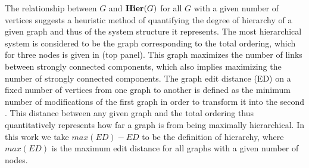 The relationship between $G$ and $\mathbf{Hier}(G)$ for all $G$ with a given number of vertices suggests a heuristic method of quantifying the degree of hierarchy of a given graph and thus of the system structure it represents. The most hierarchical system is considered to be the graph corresponding to the total ordering, which for three nodes is given in  (top panel). This graph maximizes the number of links between strongly connected components, which also implies maximizing the number of strongly connected components. The graph edit distance (ED) on a fixed number of vertices from one graph to another is defined as the minimum number of modifications of the first graph in order to transform it into the second \cite{Axenovich2011}. This distance between any given graph and the total ordering thus quantitatively represents how far a graph is from being maximally hierarchical. In this work we take $max(ED) - ED$ to be the definition of hierarchy, where $max(ED)$ is the maximum edit distance for all graphs with a given number of nodes.
